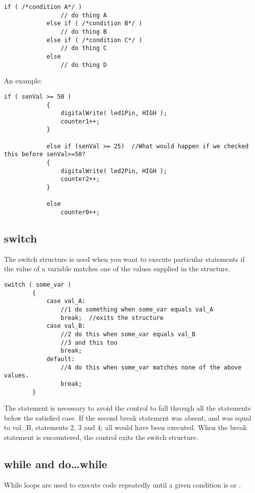 \documentclass{article}
\begin{document}
			\begin{lstlisting}[gobble=12]
			if ( /*condition A*/ )
				// do thing A
			else if ( /*condition B*/ )
				// do thing B
			else if ( /*condition C*/ )
				// do thing C
			else
				// do thing D
			\end{lstlisting}

			An example:

			\begin{lstlisting}[gobble=12]
			if ( senVal >= 50 )
			{
				digitalWrite( led1Pin, HIGH );
				counter1++;
			}

			else if (senVal >= 25)	//What would happen if we checked this before senVal>=50?
			{
				digitalWrite( led2Pin, HIGH );
				counter2++;
			}

			else 
				counter0++;

			\end{lstlisting}

	\subsection{switch}

		The switch structure is used when you want to execute particular statements if the value of a variable matches one of the values supplied in the structure.

		\begin{lstlisting}[gobble=8]
		switch ( some_var )
		{
			case val_A:
				//1 do something when some_var equals val_A
				break;	//exits the structure
			case val_B:
				//2 do this when some_var equals val_B
				//3 and this too
				break;
			default:
				//4 do this when some_var matches none of the above values.
				break;
		}
		\end{lstlisting}

		The  statement is necessary to avoid the control to fall through all the statements below the satisfied case. If the second break statement was absent, and  was equal to val\_B, statements 2, 3 and 4; all would have been executed. When the break statement is encountered, the control exits the switch structure.

	\subsection{while and do\ldots while}

		While loops are used to execute code repeatedly until a given condition is  or .
\end{document}
